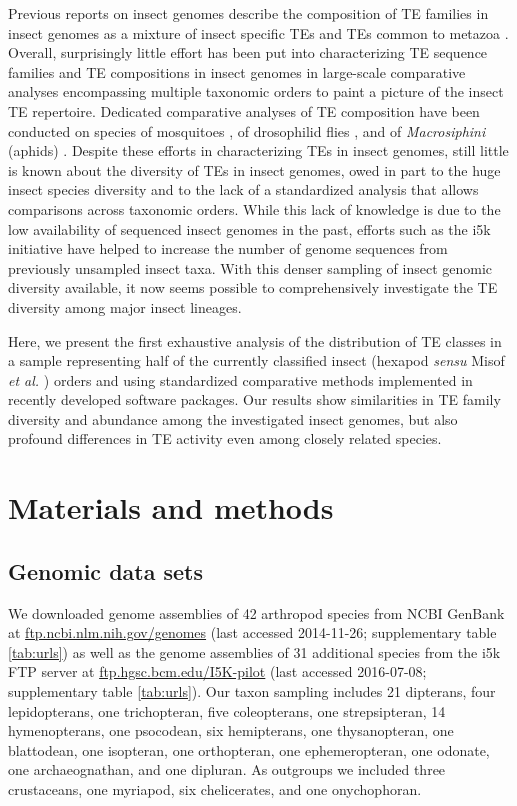 Previous reports on insect genomes describe the composition of TE
families in insect genomes as a mixture of insect specific TEs and TEs
common to metazoa \citep{Feschotte2007,Maumus2015,Chuong2016}. Overall,
surprisingly little effort has been put into characterizing TE sequence
families and TE compositions in insect genomes in large-scale
comparative analyses encompassing multiple taxonomic orders to paint a
picture of the insect TE repertoire. Dedicated comparative analyses of
TE composition have been conducted on species of mosquitoes
\citep{Neafsey2015}, of drosophilid flies \citep{Sessegolo2016}, and of
\emph{Macrosiphini} (aphids) \citep{Bouallegue2017}. Despite these
efforts in characterizing TEs in insect genomes, still little is known
about the diversity of TEs in insect genomes, owed in part to the huge
insect species diversity and to the lack of a standardized analysis that
allows comparisons across taxonomic orders. While this lack of knowledge
is due to the low availability of sequenced insect genomes in the past,
efforts such as the i5k initiative \citep{Robinson2011} have helped to
increase the number of genome sequences from previously unsampled insect
taxa. With this denser sampling of insect genomic diversity available,
it now seems possible to comprehensively investigate the TE diversity
among major insect lineages.

Here, we present the first exhaustive analysis of the distribution of TE
classes in a sample representing half of the currently classified insect
(hexapod \emph{sensu} Misof \emph{et al.} \citep{Misof2014}) orders and
using standardized comparative methods implemented in recently developed
software packages. Our results show similarities in TE family diversity
and abundance among the investigated insect genomes, but also profound
differences in TE activity even among closely related species.


\section{Materials and methods}

\subsection{Genomic data sets}

We downloaded genome assemblies of 42 arthropod species from NCBI
GenBank at \url{ftp.ncbi.nlm.nih.gov/genomes} (last accessed 2014-11-26;
supplementary table \ref{tab:urls}) as well as the genome assemblies of
31 additional species from the i5k FTP server at
\href{ftp://ftp.hgsc.bcm.edu:/I5K-pilot/}{ftp.hgsc.bcm.edu/I5K-pilot}
(last accessed 2016-07-08; supplementary table \ref{tab:urls}). Our
taxon sampling includes 21 dipterans, four lepidopterans, one
trichopteran, five coleopterans, one strepsipteran, 14 hymenopterans,
one psocodean, six hemipterans, one thysanopteran, one blattodean, one
isopteran, one orthopteran, one ephemeropteran, one odonate, one
archaeognathan, and one dipluran. As outgroups we included three
crustaceans, one myriapod, six chelicerates, and one onychophoran.

